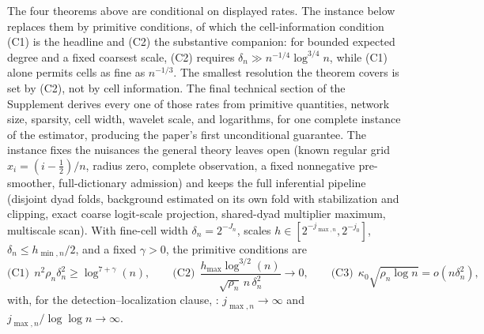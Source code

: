 \documentclass[11pt]{article}
\theoremstyle{definition}
\newcommand{\1}{\mathbf 1}\newcommand{\op}{\operatorname}
\begin{document}
The four theorems above are conditional on displayed rates.  The instance
below replaces them by primitive conditions, of which the cell-information
condition (C1) is the headline and (C2) the substantive companion: for bounded
expected degree and a fixed coarsest scale, (C2) requires
$\delta_n\gg n^{-1/4}\log^{3/4}n$, while (C1) alone permits cells as fine as
$n^{-1/3}$.  The smallest resolution the theorem covers is set by (C2), not by
cell information.  The final technical
section of the Supplement derives every one of those rates from primitive
quantities, network size, sparsity, cell width, wavelet scale, and
logarithms, for one complete instance of the estimator, producing the paper's
first unconditional guarantee.  The instance fixes the nuisances the general theory leaves open (known
regular grid $x_i=(i-\tfrac12)/n$, radius zero, complete observation, a fixed
nonnegative pre-smoother, full-dictionary admission) and keeps the full
inferential pipeline (disjoint dyad folds, background estimated on its own fold
with stabilization and clipping, exact coarse logit-scale projection,
shared-dyad multiplier maximum, multiscale scan).  With fine-cell width $\delta_n=2^{-J_n}$, scales
$h\in[2^{-j_{\max,n}},2^{-j_0}]$, $\delta_n\le h_{\min,n}/2$, and a fixed
$\gamma>0$, the primitive conditions are
\begin{equation}
\text{(C1)}\ \ n^2\rho_n\delta_n^2\ge\log^{7+\gamma}(n),
\qquad
\text{(C2)}\ \ \frac{h_{\max}\log^{3/2}(n)}{\sqrt{\rho_n}\,n\,\delta_n^2}\to0,
\qquad
\text{(C3)}\ \ \kappa_0\sqrt{\rho_n\log n}=o(n\delta_n^2),
\label{eq:uncond-conds}
\end{equation}
with, for the detection--localization clause,
: $j_{\max,n}\to\infty$ and $j_{\max,n}/\log\log n\to\infty$.
\end{document}
